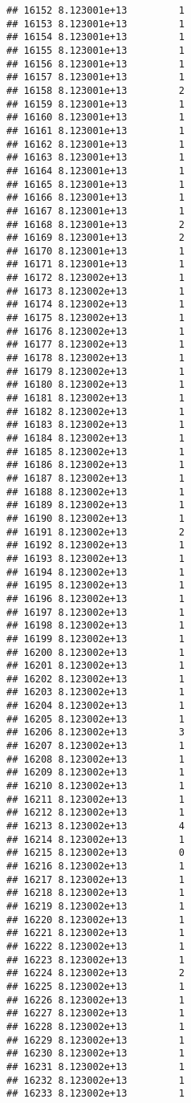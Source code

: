 \documentclass[
]{article}
\begin{document}
\begin{verbatim}
## 16152 8.123001e+13         1
## 16153 8.123001e+13         1
## 16154 8.123001e+13         1
## 16155 8.123001e+13         1
## 16156 8.123001e+13         1
## 16157 8.123001e+13         1
## 16158 8.123001e+13         2
## 16159 8.123001e+13         1
## 16160 8.123001e+13         1
## 16161 8.123001e+13         1
## 16162 8.123001e+13         1
## 16163 8.123001e+13         1
## 16164 8.123001e+13         1
## 16165 8.123001e+13         1
## 16166 8.123001e+13         1
## 16167 8.123001e+13         1
## 16168 8.123001e+13         2
## 16169 8.123001e+13         2
## 16170 8.123001e+13         1
## 16171 8.123001e+13         1
## 16172 8.123002e+13         1
## 16173 8.123002e+13         1
## 16174 8.123002e+13         1
## 16175 8.123002e+13         1
## 16176 8.123002e+13         1
## 16177 8.123002e+13         1
## 16178 8.123002e+13         1
## 16179 8.123002e+13         1
## 16180 8.123002e+13         1
## 16181 8.123002e+13         1
## 16182 8.123002e+13         1
## 16183 8.123002e+13         1
## 16184 8.123002e+13         1
## 16185 8.123002e+13         1
## 16186 8.123002e+13         1
## 16187 8.123002e+13         1
## 16188 8.123002e+13         1
## 16189 8.123002e+13         1
## 16190 8.123002e+13         1
## 16191 8.123002e+13         2
## 16192 8.123002e+13         1
## 16193 8.123002e+13         1
## 16194 8.123002e+13         1
## 16195 8.123002e+13         1
## 16196 8.123002e+13         1
## 16197 8.123002e+13         1
## 16198 8.123002e+13         1
## 16199 8.123002e+13         1
## 16200 8.123002e+13         1
## 16201 8.123002e+13         1
## 16202 8.123002e+13         1
## 16203 8.123002e+13         1
## 16204 8.123002e+13         1
## 16205 8.123002e+13         1
## 16206 8.123002e+13         3
## 16207 8.123002e+13         1
## 16208 8.123002e+13         1
## 16209 8.123002e+13         1
## 16210 8.123002e+13         1
## 16211 8.123002e+13         1
## 16212 8.123002e+13         1
## 16213 8.123002e+13         4
## 16214 8.123002e+13         1
## 16215 8.123002e+13         0
## 16216 8.123002e+13         1
## 16217 8.123002e+13         1
## 16218 8.123002e+13         1
## 16219 8.123002e+13         1
## 16220 8.123002e+13         1
## 16221 8.123002e+13         1
## 16222 8.123002e+13         1
## 16223 8.123002e+13         1
## 16224 8.123002e+13         2
## 16225 8.123002e+13         1
## 16226 8.123002e+13         1
## 16227 8.123002e+13         1
## 16228 8.123002e+13         1
## 16229 8.123002e+13         1
## 16230 8.123002e+13         1
## 16231 8.123002e+13         1
## 16232 8.123002e+13         1
## 16233 8.123002e+13         1

\end{verbatim}
\end{document}
